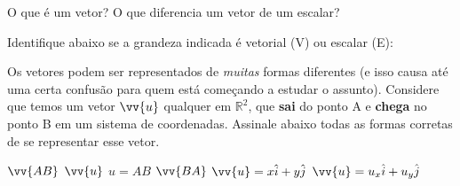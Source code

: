 \documentclass[pdftex, brazil, 12pt, oneside, addpoints]{exam}
\newcommand{\quatrolinhas}{\fillwithlines{1.00in}}
\newcommand{\vf}[1][{}]{%
  \fillin[#1][0.25in]%
}
\newcommand{\vetor}[1]{\ensuremath{\vv{#1}}}
\newcommand{\vetori}{\ensuremath{\hat{i}}}
\newcommand{\vetorj}{\ensuremath{\hat{j}}}
\begin{document}
\newpage
\begin{questions}
\setlength\linefillthickness{0.2pt}

\question
O que é um vetor? O que diferencia um vetor de um escalar?
\quatrolinhas

\question
Identifique abaixo se a grandeza indicada é vetorial (V) ou escalar (E):

\question
Os vetores podem ser representados de \emph{muitas} formas diferentes
(e isso causa até uma certa confusão para quem está começando a
estudar o assunto). Considere que temos um vetor \vetor{u} qualquer em
$\mathbb{R}^2$,
que \textbf{sai} do ponto A e \textbf{chega} no ponto B em um sistema de coordenadas.
Assinale abaixo todas as formas corretas de se representar esse vetor.
\begin{checkboxes}
  \choice \vetor{AB}
  \choice \vetor{u}
  \choice $u = AB$
  \choice \vetor{BA}
  \choice $\vetor{u} = x\vetori + y\vetorj$
  \choice $\vetor{u} = u_x\vetori + u_y\vetorj$
\end{checkboxes}


\end{questions}
\end{document}
